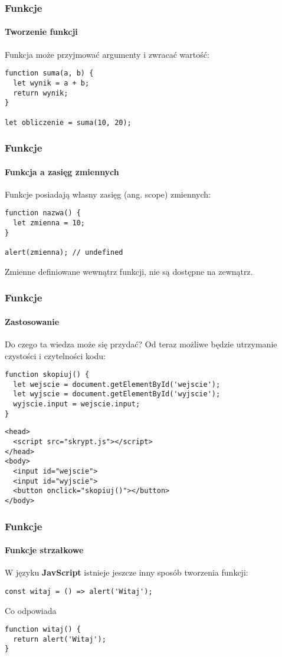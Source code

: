 \begin{frame}[fragile]
  \frametitle{Funkcje}
  \framesubtitle{Tworzenie funkcji}

  Funkcja może przyjmować argumenty i zwracać wartość:

  \begin{verbatim}
function suma(a, b) {
  let wynik = a + b;
  return wynik;
}

let obliczenie = suma(10, 20);
  \end{verbatim}

\end{frame}


\begin{frame}[fragile]
  \frametitle{Funkcje}
  \framesubtitle{Funkcja a zasięg zmiennych}

  Funkcje posiadają własny zasięg (ang. scope) zmiennych:

  \begin{verbatim}
function nazwa() {
  let zmienna = 10;
}

alert(zmienna); // undefined
  \end{verbatim}

  Zmienne definiowane wewnątrz funkcji, nie są dostępne na zewnątrz.

\end{frame}


\begin{frame}[fragile]
  \frametitle{Funkcje}
  \framesubtitle{Zastosowanie}

  Do czego ta wiedza może się przydać? Od teraz możliwe będzie utrzymanie czystości i czytelności kodu:

  \begingroup
    \footnotesize

  \begin{verbatim}
function skopiuj() {
  let wejscie = document.getElementById('wejscie');
  let wyjscie = document.getElementById('wyjscie');
  wyjscie.input = wejscie.input;
}
  \end{verbatim}

  \begin{verbatim}
<head>
  <script src="skrypt.js"></script>
</head>
<body>
  <input id="wejscie">
  <input id="wyjscie">
  <button onclick="skopiuj()"></button>
</body>
  \end{verbatim}

  \endgroup

\end{frame}


\begin{frame}[fragile]
  \frametitle{Funkcje}
  \framesubtitle{Funkcje strzałkowe}

  W języku \textbf{JavScript} istnieje jeszcze inny sposób tworzenia funkcji:

  \begin{verbatim}
const witaj = () => alert('Witaj');
  \end{verbatim}

  Co odpowiada

  \begin{verbatim}
function witaj() {
  return alert('Witaj');
}
  \end{verbatim}

\end{frame}


